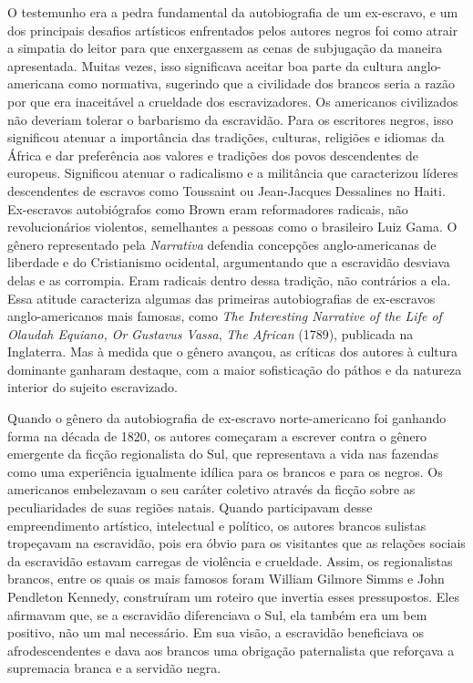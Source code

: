 O testemunho era a pedra fundamental da autobiografia de um ex-escravo,
e um dos principais desafios artísticos enfrentados pelos autores negros
foi como atrair a simpatia do leitor para que enxergassem as cenas de
subjugação da maneira apresentada. Muitas vezes, isso significava
aceitar boa parte da cultura anglo-americana como normativa, sugerindo
que a civilidade dos brancos seria a razão por que era inaceitável a
crueldade dos escravizadores. Os americanos civilizados não deveriam
tolerar o barbarismo da escravidão. Para os escritores negros, isso
significou atenuar a importância das tradições, culturas, religiões e
idiomas da África e dar preferência aos valores e tradições dos povos
descendentes de europeus. Significou atenuar o radicalismo e a
militância que caracterizou líderes descendentes de escravos como
Toussaint ou Jean-Jacques Dessalines no Haiti. Ex-escravos autobiógrafos
como Brown eram reformadores radicais, não revolucionários violentos,
semelhantes a pessoas como o brasileiro Luiz Gama. O gênero representado
pela \emph{Narrativa} defendia concepções anglo-americanas de liberdade
e do Cristianismo ocidental, argumentando que a escravidão desviava
delas e as corrompia. Eram radicais dentro dessa tradição, não
contrários a ela. Essa atitude caracteriza algumas das primeiras
autobiografias de ex-escravos anglo-americanos mais famosas, como
\emph{The Interesting Narrative of the Life of Olaudah Equiano, Or}
\emph{Gustavus Vassa}, \emph{The African} (1789), publicada na
Inglaterra. Mas à medida que o gênero avançou, as críticas dos autores à
cultura dominante ganharam destaque, com a maior sofisticação do páthos
e da natureza interior do sujeito escravizado.

Quando o gênero da autobiografia de ex-escravo norte-americano foi
ganhando forma na década de 1820, os autores começaram a escrever contra
o gênero emergente da ficção regionalista do Sul, que representava a
vida nas fazendas como uma experiência igualmente idílica para os
brancos e para os negros. Os
americanos embelezavam o seu caráter coletivo através da ficção sobre as
peculiaridades de suas regiões natais. Quando participavam desse
empreendimento artístico, intelectual e político, os autores brancos
sulistas tropeçavam na escravidão, pois era óbvio para os visitantes que
as relações sociais da escravidão estavam carregas de violência e
crueldade. Assim, os regionalistas brancos, entre os quais os mais
famosos foram William Gilmore Simms e John Pendleton Kennedy,
construíram um roteiro que invertia esses pressupostos. Eles afirmavam
que, se a escravidão diferenciava o Sul, ela também era um bem positivo,
não um mal necessário. Em sua visão, a escravidão beneficiava os
afrodescendentes e dava aos brancos uma obrigação paternalista que
reforçava a supremacia branca e a servidão negra.


